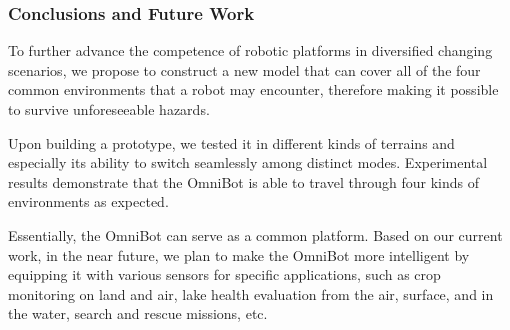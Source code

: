 \subsubsection{Conclusions and Future Work}
\label{conclusion_future}

To further advance the competence of robotic platforms in diversified changing scenarios, we propose to construct a new model that can cover all of the four common environments that a robot may encounter, therefore making it possible to survive unforeseeable hazards.

Upon building a prototype, we tested it in different kinds of terrains and especially its ability to switch seamlessly among distinct modes. Experimental results demonstrate that the OmniBot is able to travel through four kinds of environments as expected.

Essentially, the OmniBot can serve as a common platform. Based on our current work, in the near future, we plan to make the OmniBot more intelligent by equipping it with various sensors for specific applications, such as crop monitoring on land and air, lake health evaluation from the air, surface, and in the water, search and rescue missions, etc.









